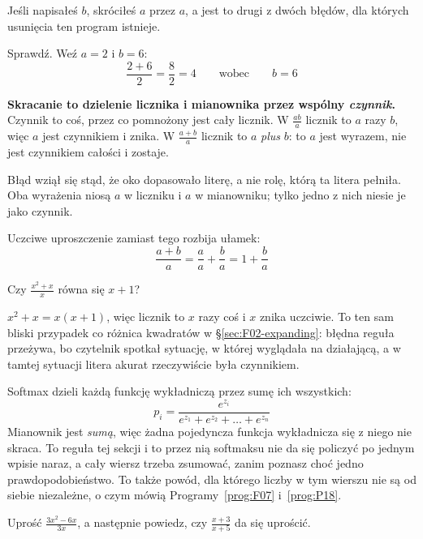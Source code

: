 \begin{fr}
\begin{ansblock}
Jeśli napisałeś $b$, skróciłeś $a$ przez $a$, a jest to drugi z dwóch błędów,
dla których usunięcia ten program istnieje.

Sprawdź. Weź $a = 2$ i $b = 6$:
\[ \frac{2 + 6}{2} = \frac{8}{2} = 4 \qquad \text{wobec} \qquad b = 6 \]
\end{ansblock}

\begin{trapbox}
\textbf{Skracanie to dzielenie licznika i mianownika przez wspólny
\emph{czynnik}.} Czynnik to coś, przez co pomnożony jest cały licznik. W
$\frac{ab}{a}$ licznik to $a$ razy $b$, więc $a$ jest czynnikiem i znika. W
$\frac{a + b}{a}$ licznik to $a$ \emph{plus} $b$: to $a$ jest wyrazem, nie
jest czynnikiem całości i zostaje.

Błąd wziął się stąd, że oko dopasowało literę, a nie rolę, którą ta litera
pełniła. Oba wyrażenia niosą $a$ w liczniku i $a$ w mianowniku; tylko jedno z
nich niesie je jako czynnik.

Uczciwe uproszczenie zamiast tego rozbija ułamek:
\[ \frac{a + b}{a} = \frac{a}{a} + \frac{b}{a} = 1 + \frac{b}{a} \]
\end{trapbox}
Czy $\frac{x^{2} + x}{x}$ równa się $x + 1$?
\nextframe
\end{fr}

\begin{fr}
$x^{2} + x = x(x + 1)$, więc licznik to $x$ razy coś i $x$ znika uczciwie. To
ten sam bliski przypadek co różnica kwadratów w \S\ref{sec:F02-expanding}:
błędna reguła przeżywa, bo czytelnik spotkał sytuację, w której wyglądała na
działającą, a w tamtej sytuacji litera akurat rzeczywiście była czynnikiem.

\begin{aibox}
Softmax dzieli każdą funkcję wykładniczą przez sumę ich wszystkich:
\[ p_{i} = \frac{e^{z_{i}}}{e^{z_{1}} + e^{z_{2}} + \dots + e^{z_{n}}} \]
Mianownik jest \emph{sumą}, więc żadna pojedyncza funkcja wykładnicza się z
niego nie skraca. To reguła tej sekcji i to przez nią softmaksu nie da się
policzyć po jednym wpisie naraz, a cały wiersz trzeba zsumować, zanim
poznasz choć jedno prawdopodobieństwo. To także powód, dla którego liczby w tym
wierszu nie są od siebie niezależne, o czym mówią
Programy~\ref{prog:F07} i~\ref{prog:P18}.
\end{aibox}

\yourturn
Uprość $\frac{3x^{2} - 6x}{3x}$, a następnie powiedz, czy
$\frac{x + 3}{x + 5}$ da się uprościć.
\dotline
\nextframe
\end{fr}

